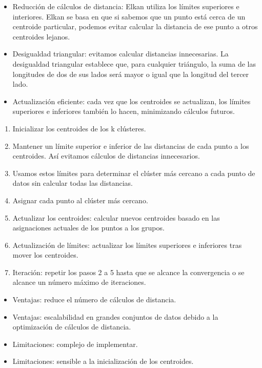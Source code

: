 \begin{itemize}
    \item Reducción de cálculos de distancia: Elkan utiliza los límites superiores e interiores. Elkan se basa en que si sabemos que un punto está cerca de un centroide particular, podemos evitar calcular la distancia de ese punto a otros centroides lejanos.

    \item Desigualdad triangular: evitamos calcular distancias innecesarias. La desigualdad triangular establece que, para cualquier triángulo, la suma de las longitudes de dos de sus lados será mayor o igual que la longitud del tercer lado.

    \item Actualización eficiente: cada vez que los centroides se actualizan, los límites superiores e inferiores también lo hacen, minimizando cálculos futuros.
\end{itemize}

\begin{enumerate}
    \item Inicializar los centroides de los k clústeres.

    \item Mantener un límite superior e inferior de las distancias de cada punto a los centroides. Así evitamos cálculos de distancias innecesarios.

    \item Usamos estos límites para determinar el clúster más cercano a cada punto de datos sin calcular todas las distancias.

    \item Asignar cada punto al clúster más cercano.

    \item Actualizar los centroides: calcular nuevos centroides basado en las asignaciones actuales de los puntos a los grupos.

    \item Actualización de límites: actualizar los límites superiores e inferiores tras mover los centroides.

    \item Iteración: repetir los pasos 2 a 5 hasta que se alcance la convergencia o se alcance un número máximo de iteraciones.


\end{enumerate}

\begin{itemize}
    \item Ventajas: reduce el número de cálculos de distancia.
    \item Ventajas: escalabilidad en grandes conjuntos de datos debido a la optimización de cálculos de distancia.

    \item Limitaciones: complejo de implementar.
    \item Limitaciones: sensible a la inicialización de los centroides.
\end{itemize}


